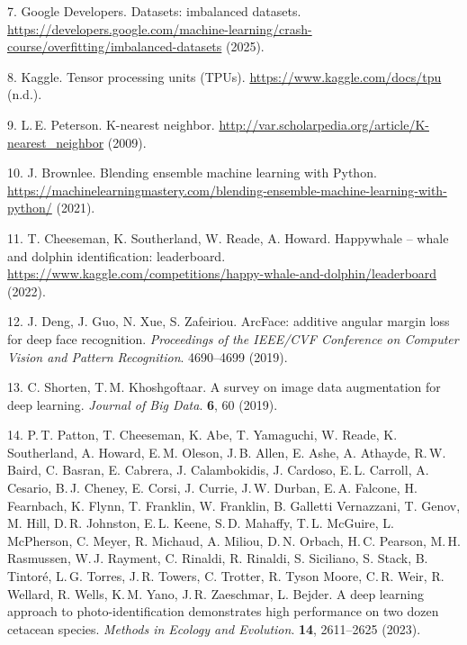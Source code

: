 \documentclass[twocolumn]{article}
\begin{document}
7. Google Developers. Datasets: imbalanced datasets. \url{https://developers.google.com/machine-learning/crash-course/overfitting/imbalanced-datasets} (2025).

8. Kaggle. Tensor processing units (TPUs). \url{https://www.kaggle.com/docs/tpu} (n.d.).

9. L.\,E. Peterson. K-nearest neighbor. \url{http://var.scholarpedia.org/article/K-nearest_neighbor} (2009).

10. J. Brownlee. Blending ensemble machine learning with Python. \url{https://machinelearningmastery.com/blending-ensemble-machine-learning-with-python/} (2021).

11. T. Cheeseman, K. Southerland, W. Reade, A. Howard. Happywhale – whale and dolphin identification: leaderboard. \url{https://www.kaggle.com/competitions/happy-whale-and-dolphin/leaderboard} (2022).

12. J. Deng, J. Guo, N. Xue, S. Zafeiriou. ArcFace: additive angular margin loss for deep face recognition. \textit{Proceedings of the IEEE/CVF Conference on Computer Vision and Pattern Recognition}. 4690–4699 (2019).

13. C. Shorten, T.\,M. Khoshgoftaar. A survey on image data augmentation for deep learning. \textit{Journal of Big Data}. \textbf{6}, 60 (2019).

14. P.\,T. Patton, T. Cheeseman, K. Abe, T. Yamaguchi, W. Reade, K. Southerland, A. Howard, E.\,M. Oleson, J.\,B. Allen, E. Ashe, A. Athayde, R.\,W. Baird, C. Basran, E. Cabrera, J. Calambokidis, J. Cardoso, E.\,L. Carroll, A. Cesario, B.\,J. Cheney, E. Corsi, J. Currie, J.\,W. Durban, E.\,A. Falcone, H. Fearnbach, K. Flynn, T. Franklin, W. Franklin, B. Galletti Vernazzani, T. Genov, M. Hill, D.\,R. Johnston, E.\,L. Keene, S.\,D. Mahaffy, T.\,L. McGuire, L. McPherson, C. Meyer, R. Michaud, A. Miliou, D.\,N. Orbach, H.\,C. Pearson, M.\,H. Rasmussen, W.\,J. Rayment, C. Rinaldi, R. Rinaldi, S. Siciliano, S. Stack, B. Tintoré, L.\,G. Torres, J.\,R. Towers, C. Trotter, R. Tyson Moore, C.\,R. Weir, R. Wellard, R. Wells, K.\,M. Yano, J.\,R. Zaeschmar, L. Bejder. A deep learning approach to photo-identification demonstrates high performance on two dozen cetacean species. \textit{Methods in Ecology and Evolution}. \textbf{14}, 2611–2625 (2023).
\end{document}
